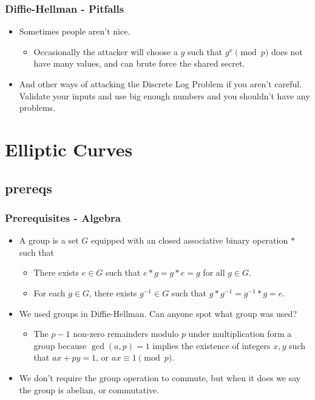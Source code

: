 \documentclass[aspectratio=169,t]{beamer}
\begin{document}
\begin{frame}
\frametitle{Diffie-Hellman - Pitfalls}
\begin{itemize}
\item
Sometimes people aren't nice.
\begin{itemize}
\item
Occasionally the attacker will choose a $g$ such that $g^x \pmod{p}$ does not
have many values, and can brute force the shared secret.
\end{itemize}
\pause
\item
And other ways of attacking the Discrete Log Problem if you aren't careful.
Validate your inputs and use big enough numbers and you shouldn't have any
problems.
\end{itemize}
\end{frame}

\section{Elliptic Curves}

\subsection{prereqs}
\begin{frame}
\frametitle{Prerequisites - Algebra}
\begin{itemize}
\item
A group is a set $G$ equipped with an closed associative binary operation $*$
such that
\begin{itemize}
\item
There exists $e \in G$ such that $e * g = g * e = g$ for all $g \in G$.
\item
For each $g \in G$, there exists $g^{-1} \in G$ such that $g * g^{-1} = g^{-1} *
g = e$.
\end{itemize}
\item
We used groups in Diffie-Hellman. Can anyone spot what group was used? \pause
\begin{itemize}
\item
The $p - 1$ non-zero remainders modulo $p$ under multiplication form a group
because $\gcd(a, p) = 1$ implies the existence of integers $x, y$ such that $ax
+ py = 1$, or $ax \equiv 1 \pmod{p}$.
\end{itemize}
\pause
\item
We don't require the group operation to commute, but when it does we say the
group is abelian, or commutative.
\end{itemize}
\end{frame}
\end{document}
